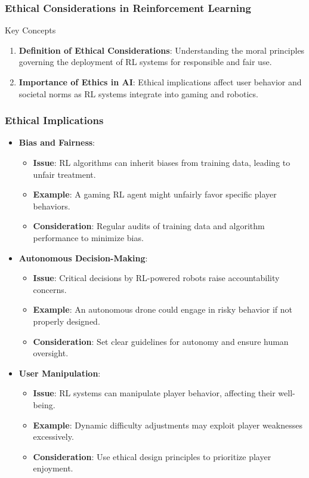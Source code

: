 \documentclass[aspectratio=169]{beamer}
\begin{document}
\begin{frame}[fragile]
    \frametitle{Ethical Considerations in Reinforcement Learning}
    
    \begin{block}{Key Concepts}
        \begin{enumerate}
            \item \textbf{Definition of Ethical Considerations}: Understanding the moral principles governing the deployment of RL systems for responsible and fair use.
            \item \textbf{Importance of Ethics in AI}: Ethical implications affect user behavior and societal norms as RL systems integrate into gaming and robotics.
        \end{enumerate}
    \end{block}
\end{frame}

\begin{frame}[fragile]
    \frametitle{Ethical Implications}
    
    \begin{itemize}
        \item \textbf{Bias and Fairness}:
        \begin{itemize}
            \item \textbf{Issue}: RL algorithms can inherit biases from training data, leading to unfair treatment.
            \item \textbf{Example}: A gaming RL agent might unfairly favor specific player behaviors.
            \item \textbf{Consideration}: Regular audits of training data and algorithm performance to minimize bias.
        \end{itemize}
        
        \item \textbf{Autonomous Decision-Making}:
        \begin{itemize}
            \item \textbf{Issue}: Critical decisions by RL-powered robots raise accountability concerns.
            \item \textbf{Example}: An autonomous drone could engage in risky behavior if not properly designed.
            \item \textbf{Consideration}: Set clear guidelines for autonomy and ensure human oversight.
        \end{itemize}
        
        \item \textbf{User Manipulation}:
        \begin{itemize}
            \item \textbf{Issue}: RL systems can manipulate player behavior, affecting their well-being.
            \item \textbf{Example}: Dynamic difficulty adjustments may exploit player weaknesses excessively.
            \item \textbf{Consideration}: Use ethical design principles to prioritize player enjoyment.
        \end{itemize}
    \end{itemize}
\end{frame}
\end{document}
